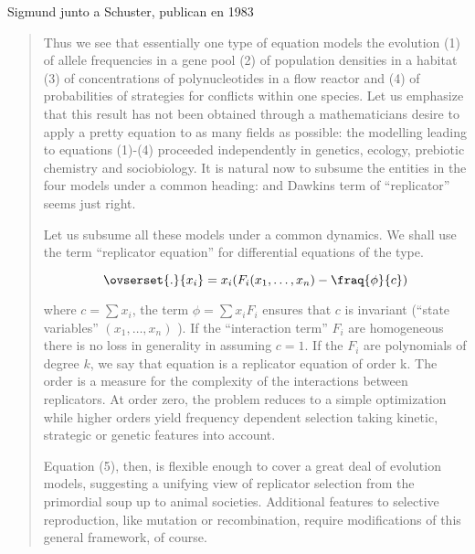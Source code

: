 \documentclass[a4paper,10pt]{article}
\begin{document}
Sigmund junto a Schuster, publican en 1983
\begin{quotation} \cite{schuster1983-replicatorDynamics}
    Thus we see that essentially one type of equation models the evolution (1) of allele frequencies in a gene pool (2) of population densities in a habitat (3) of concentrations of polynucleotides in a flow reactor and (4) of probabilities of strategies for conflicts within one species.
    Let us emphasize that this result has not been obtained through a mathematicians desire to apply a pretty equation to as many fields as possible: the modelling leading to equations (1)-(4) proceeded independently in genetics, ecology, prebiotic chemistry and sociobiology.
    It is natural now to subsume the entities in the four models under a common heading: and Dawkins term of ``replicator'' seems just right.
    
    Let us subsume all these models under a common dynamics. We shall use the term ``replicator equation'' for differential equations of the type.
    
    \begin{equation}
    \ovserset{.}{x_i} = x_i (F_i(x_1, \dots, x_n) - \fraq{\phi}{c})
    \end{equation}
    
    where $c=\sum x_i$, the term $\phi = \sum x_i F_i$ ensures that $c$ is invariant (``state variables'' $(x_1, \dots, x_n)$ ).
    If the ``interaction term'' $F_i$ are homogeneous there is no loss in generality in assuming $c = 1$.
    If the $F_i$ are polynomials of degree $k$, we say that equation is a replicator equation of order k.
    The order is a measure for the complexity of the interactions between replicators.
    At order zero, the problem reduces to a simple optimization while higher orders yield frequency dependent selection taking kinetic, strategic or genetic features into account.
    
    Equation (5), then, is flexible enough to cover a great deal of evolution models, suggesting a unifying view of replicator selection from the primordial soup up to animal societies.
    Additional features to selective reproduction, like mutation or recombination, require modifications of this general framework, of course.
    
\end{quotation}

\\
\end{document}
